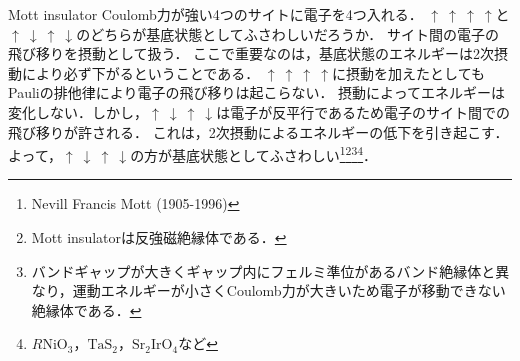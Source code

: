\documentclass{report}
\begin{document}
  \begin{myex}{Mott insulator}{}
    Coulomb力が強い4つのサイトに電子を4つ入れる．
    $\uparrow \ \uparrow\ \uparrow\ \uparrow$と$\uparrow\ \downarrow\ \uparrow\ \downarrow$のどちらが基底状態としてふさわしいだろうか．
    サイト間の電子の飛び移りを摂動として扱う．
    ここで重要なのは，基底状態のエネルギーは2次摂動により必ず下がるということである．
    $\uparrow \ \uparrow\ \uparrow\ \uparrow$に摂動を加えたとしてもPauliの排他律により電子の飛び移りは起こらない．
    摂動によってエネルギーは変化しない．しかし，$\uparrow\ \downarrow\ \uparrow\ \downarrow$は電子が反平行であるため電子のサイト間での飛び移りが許される．
    これは，2次摂動によるエネルギーの低下を引き起こす．
    よって，$\uparrow\ \downarrow\ \uparrow\ \downarrow$の方が基底状態としてふさわしい\footnote{
      Nevill Francis Mott (1905-1996)
    }\footnote{
      Mott insulatorは反強磁絶縁体である．
    }\footnote{
      バンドギャップが大きくギャップ内にフェルミ準位があるバンド絶縁体と異なり，運動エネルギーが小さくCoulomb力が大きいため電子が移動できない絶縁体である．
    }\footnote{
      $R\mathrm{NiO_3，TaS_2，Sr_2IrO_4}$など
    }．
  \end{myex}
\end{document}

